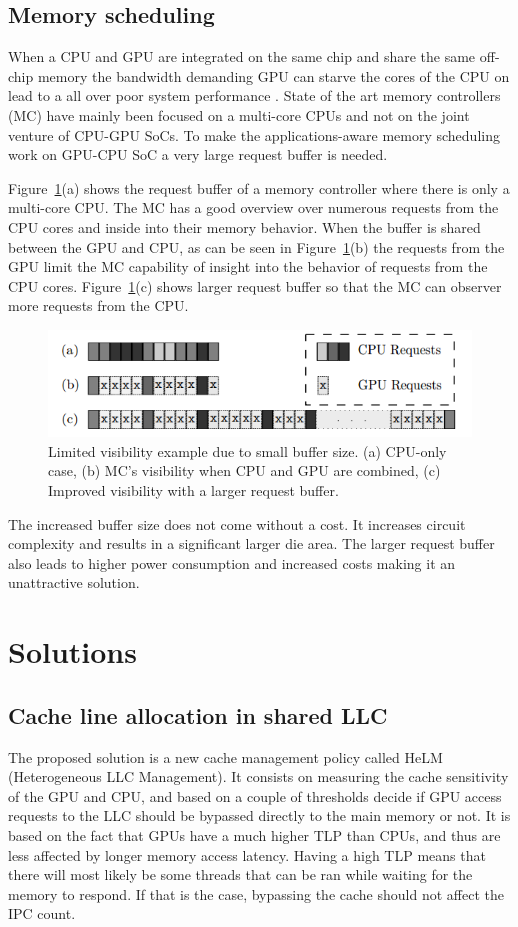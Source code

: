 \documentclass[12pt,journal,compsoc]{IEEEtran}
\begin{document}
\subsection{Memory scheduling}
When a CPU and GPU are integrated on the same chip and share the same off-chip memory the bandwidth demanding GPU can starve the cores of the CPU on lead to a all over poor system performance \cite{SmS}.  State of the art memory controllers (MC) have mainly been focused on a multi-core CPUs and not on the joint venture of CPU-GPU SoCs.  To make the applications-aware memory scheduling work on GPU-CPU SoC a very large request buffer is needed.

Figure~\ref{fig:buff}(a) shows the request buffer of a memory controller where there is only a multi-core CPU.  The MC has a good overview over
numerous requests from the CPU cores and inside into their memory behavior.  When the buffer is shared between the GPU and CPU, as can be seen in Figure~\ref{fig:buff}(b) the requests from the GPU limit the MC capability of insight into the behavior of requests from the CPU cores.  Figure~\ref{fig:buff}(c) shows larger request buffer so that the MC can observer more requests from the CPU.

\begin{figure}[H]
\centering
	\includegraphics[width = 8 cm]{graphics/no1.png}
	\caption{Limited visibility example due to small buffer size. (a) CPU-only
	case, (b) MC’s visibility when CPU and GPU are combined, (c) Improved
	visibility with a larger request buffer.\cite{SmS}}\label{fig:buff}
\end{figure} 

The increased buffer size does not come without a cost. It increases circuit complexity and results in a significant larger die area. The larger request buffer also leads to higher power consumption and increased costs \cite{SmS} making it an unattractive solution. 

\section{Solutions}
\subsection{Cache line allocation in shared LLC}
The proposed solution is a new cache management policy called HeLM (Heterogeneous LLC Management). It consists on measuring the cache sensitivity of the GPU and CPU, and based on a couple of thresholds decide if GPU access requests to the LLC should be bypassed directly to the main memory or not.
It is based on the fact that GPUs have a much higher TLP than CPUs, and thus are less affected by longer memory access latency. Having a high TLP means that there will most likely be some threads that can be ran while waiting for the memory to respond. If that is the case, bypassing the cache should not affect the IPC count.
\end{document}
